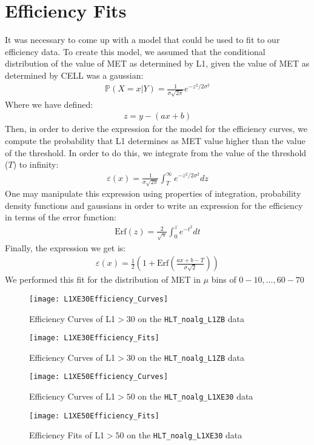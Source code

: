 \section{Efficiency Fits}
It was necessary to come up with a model that could be used to fit to our efficiency data. To create this model, we assumed that the conditional distribution of the value of MET as determined by L1, given the value of MET as determined by CELL was a gaussian:
\begin{align}
		\mathbb{P}(X=x|Y) = \frac{1}{\sigma \sqrt{2\pi}} e^{-z^2/2\sigma^2}
\end{align}
Where we have defined:
\begin{align}
		z=y-(ax+b)
\end{align}
Then, in order to derive the expression for the model for the efficiency curves, we compute the probability that L1 determines as MET value higher than the value of the threshold. In order to do this, we integrate from the value of the threshold ($T$) to infinity:
\begin{align}
		\varepsilon(x)=\frac{1}{\sigma \sqrt{2\pi}}\int_{T}^{\infty}e^{-z^2/2\sigma^2}dz
\end{align}
One may manipulate this expression using properties of integration, probability density functions and gaussians in order to write an expression for the efficiency in terms of the error function:
\begin{align}
		\textrm{Erf}(z)=\frac{2}{\sqrt{\pi}}\int_0^{z}e^{-t^2}dt
\end{align}
Finally, the expression we get is:
\begin{align}
		\varepsilon(x)=\frac{1}{2}\left( 1+\textrm{Erf}\left( \frac{ax+b-T}{\sigma\sqrt{2}} \right) \right)
\end{align}
We performed this fit for the distribution of MET in $\mu$ bins of $0-10,\ldots,60-70$
\pagebreak
\begin{figure}[h]
		\centering
		\texttt{[image: L1XE30Efficiency\_Curves]}
		\caption{Efficiency Curves of L1$>30$ on the \texttt{HLT\_noalg\_L1ZB} data}
\end{figure}
\begin{figure}[h]
		\centering
		\texttt{[image: L1XE30Efficiency\_Fits]}
		\caption{Efficiency Curves of L1$>30$ on the \texttt{HLT\_noalg\_L1ZB} data}
\end{figure}
\begin{figure}[h]
		\centering
		\texttt{[image: L1XE50Efficiency\_Curves]}
		\caption{Efficiency Curves of L1$>50$ on the \texttt{HLT\_noalg\_L1XE30} data}
\end{figure}
\begin{figure}[h]
		\centering
		\texttt{[image: L1XE50Efficiency\_Fits]}
		\caption{Efficiency Fits of L1$>50$ on the \texttt{HLT\_noalg\_L1XE30} data}
\end{figure}
\clearpage
